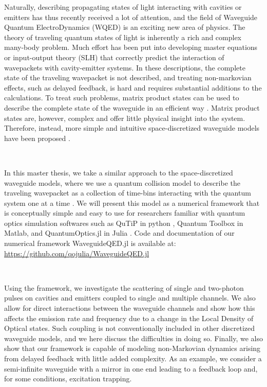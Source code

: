 Naturally, describing propagating states of light interacting with cavities or emitters has thus recently received a lot of attention, and the field of Waveguide Quantum ElectroDynamics (WQED) is an exciting new area of physics. The theory of traveling quantum states of light is inherently a rich and complex many-body problem. Much effort has been put into developing master equations \cite{Baragiola2012N-PhotonSystem} or input-output theory (SLH) \cite{Kiilerich2019Input-OutputPulses,Kiilerich2020QuantumRadiation,Lund2023PerfectPulse,Yang2022DeterministicSystems} that correctly predict the interaction of wavepackets with cavity-emitter systems. In these descriptions, the complete state of the traveling wavepacket is  not described, and treating non-markovian effects, such as delayed feedback, is hard and requires substantial additions to the calculations. To treat such problems, matrix product states can be used to describe the complete state of the waveguide in an efficient way \cite{ArranzRegidor2021ModelingModel,Richter2022EnhancedNetworks}. Matrix product states are, however, complex and offer little physical insight into the system. Therefore, instead, more simple and intuitive space-discretized waveguide models have been proposed \cite{Crowder2020QuantumFeedback,Crowder2022QuantumFeedback}.  

\

In this master thesis, we take a similar approach to the space-discretized waveguide models, where we use a quantum collision model \cite{Ciccarello2018CollisionOptics} to describe the traveling wavepacket as a collection of time-bins interacting with the quantum system one at a time \cite{Heuck2020Photon-photonCavities,Heuck2020Controlled-PhaseNonlinearities,Krastanov2022Controlled-phaseEmitter}. We will present this model as a numerical framework that is conceptually simple and easy to use for researchers familiar with quantum optics simulation softwares such as QuTiP in python \cite{Johansson2012QuTiP:Systems,Johansson2013QuTiPSystems}, Quantum Toolbox in Matlab, and QuantumOptics.jl in Julia \cite{Kramer2018QuantumOptics.jl:Systems}.  Code and documentation of our numerical framework WaveguideQED.jl is available at: \hyperlink{https://github.com/qojulia/WaveguideQED.jl}{https://github.com/qojulia/WaveguideQED.jl} 

\

Using the framework, we investigate the scattering of single and two-photon pulses on cavities and emitters coupled to single and multiple channels. We also allow for direct interactions between the waveguide channels and show how this affects the emission rate and frequency due to a change in the Local Density of Optical states. Such coupling is not conventionally included in other discretized waveguide models, and we here discuss the difficulties in doing so. Finally, we also show that our framework is capable of modeling non-Markovian dynamics arising from delayed feedback with little added complexity. As an example, we consider a semi-infinite waveguide with a mirror in one end leading to a feedback loop and, for some conditions, excitation trapping.




